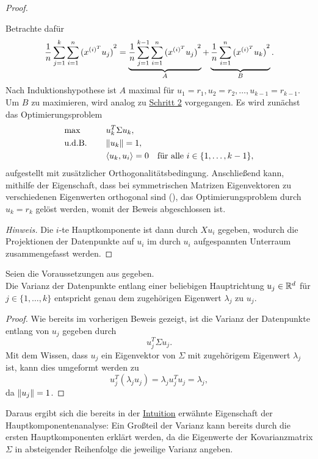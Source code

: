 \begin{proof}
\begin{enumerate}[wide,label=\underline{Schritt \arabic*}.]
    Betrachte dafür
    \begin{equation*}
        \frac{1}{n}\sum_{j=1}^{k}\sum_{i=1}^{n}{(x^{{(i)}^{T}}u_{j})}^{2} = \underbrace{\frac{1}{n}\sum_{j=1}^{k-1}\sum_{i=1}^{n}{(x^{{(i)}^{T}}u_{j})}^{2}}_{A} + \underbrace{\vphantom{\sum_{j=1}}\frac{1}{n}\sum_{i=1}^{n}{(x^{{(i)}^{T}}u_{k})}^{2}}_{B}.
    \end{equation*}
    Nach Induktionshypothese ist \(A\) maximal für \(u_{1}=r_{1},u_{2}=r_{2},\ldots,u_{k-1}=r_{k-1}\). 
    Um \(B\) zu maximieren, wird analog zu \hyperref[itm:pca2]{Schritt 2} vorgegangen.
    Es wird zunächst das Optimierungsproblem
    \begin{alignat*}{2}
        &\!\max \qquad &&u_{k}^{T} \Sigma u_{k}, \\
        &\text{u.d.B.}  &&\lVert u_{k}\rVert=1, \\   
        &&& \langle u_{k},u_{i} \rangle = 0 \quad \text{für alle } i \in \{1,\ldots,k-1\},    
    \end{alignat*}
    aufgestellt mit zusätzlicher Orthogonalitätsbedingung.
    Anschließend kann, mithilfe der Eigenschaft, dass bei symmetrischen Matrizen Eigenvektoren zu verschiedenen Eigenwerten orthogonal sind (), das Optimierungsproblem durch \(u_{k} = r_{k}\) gelöst werden, womit der Beweis abgeschlossen ist.
\end{enumerate}
\emph{Hinweis.} Die \(i\)-te Hauptkomponente ist dann durch \(Xu_{i}\) gegeben, wodurch die Projektionen der Datenpunkte auf \(u_{i}\) im durch \(u_{i}\) aufgespannten Unterraum zusammengefasst werden.    
\end{proof}
\begin{corollary}
    Seien die Voraussetzungen aus  gegeben. \\
    Die Varianz der Datenpunkte entlang einer beliebigen Hauptrichtung \(u_{j} \in \mathbb{R}^{d}\) für \(j \in \{1,\ldots,k\}\) entspricht genau dem zugehörigen Eigenwert \(\lambda_{j}\)  zu \(u_{j}\).    
\end{corollary}
\begin{proof}
    Wie bereits im vorherigen Beweis gezeigt, ist die Varianz der Datenpunkte entlang von \(u_{j}\) gegeben durch
    \begin{equation*}
        u_{j}^{T}\Sigma u_{j}.
    \end{equation*}
    Mit dem Wissen, dass \(u_{j}\) ein Eigenvektor von \(\Sigma\) mit zugehörigem Eigenwert \(\lambda_{j}\) ist, kann dies umgeformt werden zu
    \begin{equation*}
        u_{j}^{T}(\lambda_{j}u_{j}) = \lambda_{j}u_{j}^{T}u_{j} = \lambda_{j},
    \end{equation*}   
    da \(\lVert u_{j}\rVert=1\). 
\end{proof}
\begin{remark}
    Daraus ergibt sich die bereits in der \hyperref[sec:pcaint]{Intuition} erwähnte Eigenschaft der Hauptkomponentenanalyse:
    Ein Großteil der Varianz kann bereits durch die ersten Hauptkomponenten erklärt werden, da die Eigenwerte der Kovarianzmatrix \(\Sigma\) in absteigender Reihenfolge die jeweilige Varianz angeben.
\end{remark}

